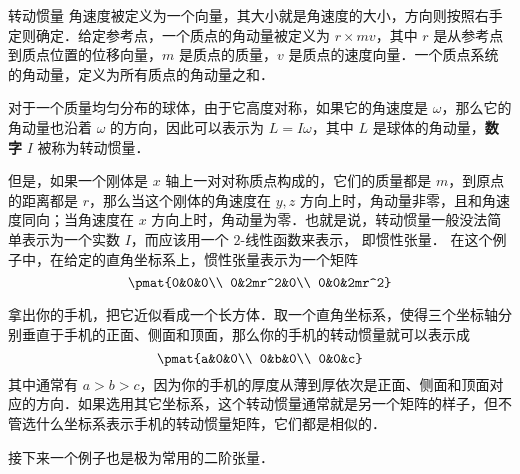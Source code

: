 \begin{example}{转动惯量}
角速度被定义为一个向量，其大小就是角速度的大小，方向则按照右手定则确定．给定参考点，一个质点的角动量被定义为 ${r}\times m{v}$，其中 ${r}$ 是从参考点到质点位置的位移向量，$m$ 是质点的质量，${v}$ 是质点的速度向量．一个质点系统的角动量，定义为所有质点的角动量之和．

对于一个质量均匀分布的球体，由于它高度对称，如果它的角速度是 ${\omega}$，那么它的角动量也沿着 ${\omega}$ 的方向，因此可以表示为 ${L}=I{\omega}$，其中 ${L}$ 是球体的角动量，\textbf{数字} $I$ 被称为转动惯量．

但是，如果一个刚体是 $x$ 轴上一对对称质点构成的，它们的质量都是 $m$，到原点的距离都是 $r$，那么当这个刚体的角速度在 $y,z$ 方向上时，角动量非零，且和角速度同向；当角速度在 $x$ 方向上时，角动量为零．也就是说，转动惯量一般没法简单表示为一个实数 $I$，而应该用一个 $2$-线性函数来表示， 即惯性张量． 在这个例子中，在给定的直角坐标系上，惯性张量表示为一个矩阵
\begin{equation}
\pmat{0&0&0\\ 0&2mr^2&0\\ 0&0&2mr^2}
\end{equation}

拿出你的手机，把它近似看成一个长方体．取一个直角坐标系，使得三个坐标轴分别垂直于手机的正面、侧面和顶面，那么你的手机的转动惯量就可以表示成
\begin{equation}
\pmat{a&0&0\\ 0&b&0\\ 0&0&c}
\end{equation}
其中通常有 $a>b>c$，因为你的手机的厚度从薄到厚依次是正面、侧面和顶面对应的方向．如果选用其它坐标系，这个转动惯量通常就是另一个矩阵的样子，但不管选什么坐标系表示手机的转动惯量矩阵，它们都是相似的．
\end{example}

接下来一个例子也是极为常用的二阶张量．

